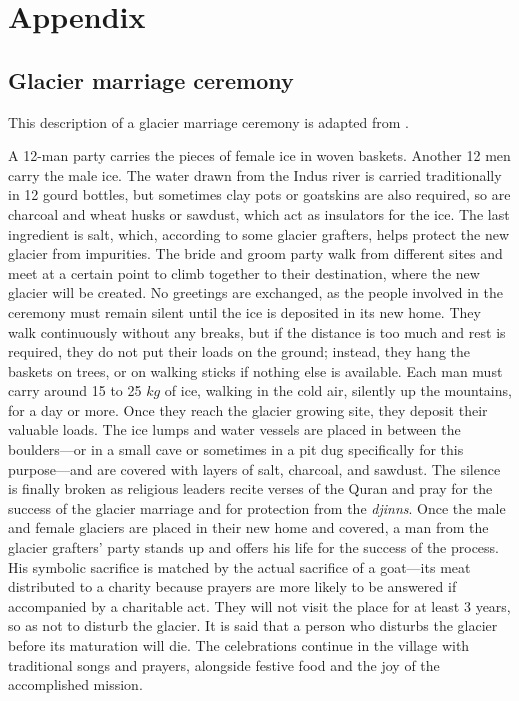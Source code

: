 \chapter{Appendix}
\label{sec:appendix}

\section{Glacier marriage ceremony}
\label{sec:glacier_marriage}

This description of a glacier marriage ceremony is adapted from \citet{khanMarriageGlaciersPrzekroj2020}.

A 12-man party carries the pieces of female ice in woven baskets. Another 12 men carry the male ice. The water
drawn from the Indus river is carried traditionally in 12 gourd bottles, but sometimes clay pots or goatskins
are also required, so are charcoal and wheat husks or sawdust, which act as insulators for the ice. The last
ingredient is salt, which, according to some glacier grafters, helps protect the new glacier from impurities.
The bride and groom party walk from different sites and meet at a certain point to climb together to their
destination, where the new glacier will be created. No greetings are exchanged, as the people involved in the
ceremony must remain silent until the ice is deposited in its new home. They walk continuously without
any breaks, but if the distance is too much and rest is required, they do not put their loads on the ground;
instead, they hang the baskets on trees, or on walking sticks if nothing else is available. Each man must
carry around 15 to 25 $kg$ of ice, walking in the cold air, silently up the mountains, for a day or more. Once
they reach the glacier growing site, they deposit their valuable loads. The ice lumps and water vessels are
placed in between the boulders---or in a small cave or sometimes in a pit dug specifically for this purpose---and
are covered with layers of salt, charcoal, and sawdust. The silence is finally broken as religious leaders recite
verses of the Quran and pray for the success of the glacier marriage and for protection from the \textit{djinns}. Once
the male and female glaciers are placed in their new home and covered, a man from the glacier grafters' party
stands up and offers his life for the success of the process. His symbolic sacrifice is matched by the actual
sacrifice of a goat---its meat distributed to a charity because prayers are more likely to be answered if
accompanied by a charitable act. They will not visit the place for at least 3 years, so as not to disturb
the glacier. It is said that a person who disturbs the glacier before its maturation will die. The celebrations
continue in the village with traditional songs and prayers, alongside festive food and the joy of the
accomplished mission.


